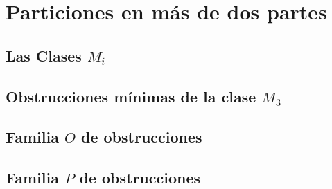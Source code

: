 \section{Particiones en más de dos partes}
    \subsection{Las Clases $M_i$}

    \subsection{Obstrucciones mínimas de la clase $M_3$}
        

    \subsection{Familia $O$ de obstrucciones}

    \subsection{Familia $P$ de obstrucciones}

